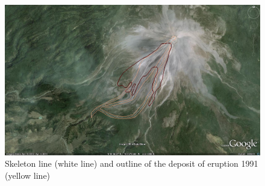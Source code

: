 \documentclass[letterpaper,10pt]{article}
\begin{document}
\begin{figure}[H]
\centerline{\includegraphics[width=\textwidth]{IMAGES/levelset.jpg}}
\caption{Skeleton line (white line) and outline of the deposit of eruption 1991 (yellow line)}
\label{skel_outline}
\end{figure}
% 
\end{document}
